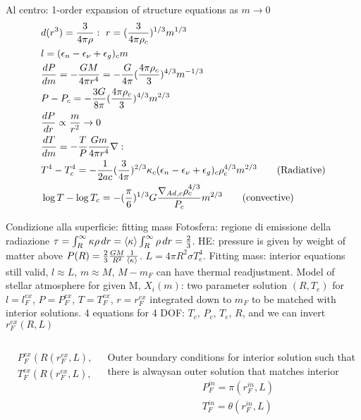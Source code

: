 \begin{frame}[fragile]{Al centro: 1-order expansion of structure equations as $m\to0$}
	\begin{align*}
	&d(r^3)=\frac{3}{4\pi\rho}:\ r=(\frac{3}{4\pi\rho_c})^{1/3}m^{1/3}\\
	&l=(\epsilon_n-\epsilon_{\nu}+\epsilon_g)_cm\\
	&\TDy{m}{P}=-\frac{GM}{4\pi r^4}=-\frac{G}{4\pi}(\frac{4\pi\rho_c}{3})^{4/3}m^{-1/3}\\
	&P-P_c=-\frac{3G}{8\pi}(\frac{4\pi\rho_c}{3})^{4/3}m^{2/3}\\
	&\TDy{r}{P}\propto\frac{m}{r^2}\to0\\
	&\TDy{m}{T}=-\frac{T}{P}\frac{Gm}{4\pi r^4}\nabla:\\
	&T^4-T_c^4=-\frac{1}{2ac}(\frac{3}{4\pi})^{2/3}\kappa_c(\epsilon_n-\epsilon_{\nu}+\epsilon_g)_c\rho_c^{4/3}m^{2/3}\tag{Radiative}\\
	&\log{T}-\log{T_c}=-(\frac{\pi}{6})^{1/3}G\frac{\nad{}_{,c}\rho_c^{4/3}}{P_c}m^{2/3}\tag{convective}
	\end{align*}
\end{frame}

\begin{frame}{Condizione alla superficie: fitting mass}
Fotosfera: regione di emissione della radiazione $\tau=\int_R^{\infty}\kappa\rho\,dr=\langle \kappa \rangle\int_R^{\infty}\rho\,dr=\frac{2}{3}$. HE: pressure is given by weight of matter above $P(R)=\frac{2}{3}\frac{GM}{R^2}\frac{1}{\langle \kappa \rangle}$. $L=4\pi R^2\sigma T_e^4$.
Fitting mass: interior equations still valid, $l\approx L$, $m\approx M$, $M-m_F$ can have thermal readjustment.
Model of stellar atmosphere for given M, $X_i(m)$: two parameter solution $(R,T_e)$ for $l=l_F^{ex}$, $P=P_F^{ex}$, $T=T_F^{ex}$, $r=r_F^{ex}$ integrated down to $m_F$ to be matched with interior solutions.
4 equations for 4 DOF: $T_c$, $P_c$, $T_e$, $R$, and we can invert $r_F^{ex}(R,L)$
\begin{columns}[T]
\begin{column}{0.5\textwidth}
\begin{align*}
&P_F^{ex}(R(r_F^{ex},L),L)=\pi(r_F^{ex},L)\\
&T_F^{ex}(R(r_F^{ex},L),L)=\theta(r_F^{ex},L)
\end{align*}
\end{column}
\begin{column}{0.445\textwidth}
	Outer boundary conditions for interior solution such that there is alwaysan outer solution that matches interior
\begin{align*}
&P_F^{in}=\pi(r_F^{in},L)\\
&T_F^{in}=\theta(r_F^{in},L)
\end{align*}
\end{column}
\end{columns}

\end{frame}

